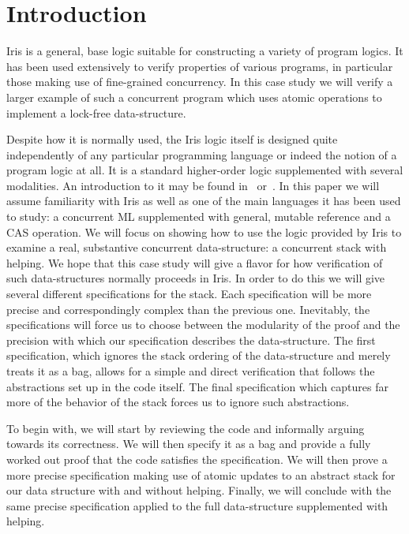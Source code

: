\section{Introduction}

Iris is a general, base logic suitable for constructing a variety of
program logics. It has been used extensively to verify properties of
various programs, in particular those making use of fine-grained
concurrency. In this case study we will verify a larger example of
such a concurrent program which uses atomic operations to implement a
lock-free data-structure.

Despite how it is normally used, the Iris logic itself is designed
quite independently of any particular programming language or indeed
the notion of a program logic at all. It is a standard higher-order
logic supplemented with several modalities. An introduction to it may
be found in~\citet{Jung:2017} or~\citet{Jung:2015}. In this paper we
will assume familiarity with Iris as well as one of the main languages
it has been used to study: a concurrent ML supplemented with general,
mutable reference and a CAS operation. We will focus on showing how to
use the logic provided by Iris to examine a real, substantive
concurrent data-structure: a concurrent stack with helping. We hope
that this case study will give a flavor for how verification of such
data-structures normally proceeds in Iris. In order to do this we will
give several different specifications for the stack. Each
specification will be more precise and correspondingly complex than
the previous one. Inevitably, the specifications will force us to
choose between the modularity of the proof and the precision with
which our specification describes the data-structure. The first
specification, which ignores the stack ordering of the data-structure
and merely treats it as a bag, allows for a simple and direct
verification that follows the abstractions set up in the code
itself. The final specification which captures far more of the
behavior of the stack forces us to ignore such abstractions.

To begin with, we will start by reviewing the code and informally
arguing towards its correctness. We will then specify it as a bag and
provide a fully worked out proof that the code satisfies the
specification. We will then prove a more precise specification making
use of atomic updates to an abstract stack for our data structure with
and without helping. Finally, we will conclude with the same precise
specification applied to the full data-structure supplemented with
helping.


